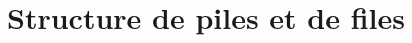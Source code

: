 \renewcommand{\cache}[1]{\phantomchoix{#1}\hspace*{0.1mm}}

\usepackage{algorithm}
\usepackage{algorithmic}
\renewcommand{\algorithmicrequire} {\textbf{\textsc{Entrées:}}}
\renewcommand{\algorithmicensure}  {\textbf{\textsc{Sorties:}}}
\renewcommand{\algorithmicwhile}   {\textbf{tantque}}
\renewcommand{\algorithmicdo}      {\textbf{faire}}
\renewcommand{\algorithmicendwhile}{\textbf{fin tantque}}
\renewcommand{\algorithmicend}     {\textbf{fin}}
\renewcommand{\algorithmicif}      {\textbf{si}}
\renewcommand{\algorithmicendif}   {\textbf{finsi}}
\renewcommand{\algorithmicelse}    {\textbf{sinon}}
\renewcommand{\algorithmicthen}    {\textbf{alors}}
\renewcommand{\algorithmicfor}     {\textbf{pour}}
\renewcommand{\algorithmicforall}  {\textbf{pour tout}}
\renewcommand{\algorithmicdo}      {\textbf{faire}}
\renewcommand{\algorithmicendfor}  {\textbf{fin pour}}
\renewcommand{\algorithmicloop}    {\textbf{boucler}}
\renewcommand{\algorithmicendloop} {\textbf{fin boucle}}
\renewcommand{\algorithmicrepeat}  {\textbf{répéter}}
\renewcommand{\algorithmicuntil}   {\textbf{jusqu'à}}


\let\mylistof\listof
\renewcommand\listof[2]{\mylistof{algorithm}{Liste des algorithmes}}

\makeatletter
\providecommand*{\toclevel@algorithm}{0}
\makeatother


\entetecoursinfo




\section{Structure de piles et de files}


